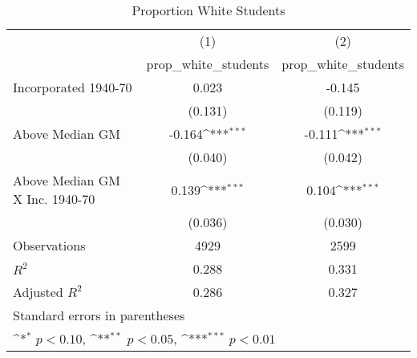 \begin{table}[htbp]\centering
\def\sym#1{\ifmmode^{#1}\else\(^{#1}\)\fi}
\caption{Proportion White Students}
\begin{tabular}{l*{2}{c}}
\hline\hline
                    &\multicolumn{1}{c}{(1)}&\multicolumn{1}{c}{(2)}\\
                    &\multicolumn{1}{c}{prop\_white\_students}&\multicolumn{1}{c}{prop\_white\_students}\\
\hline
Incorporated 1940-70&       0.023         &      -0.145         \\
                    &     (0.131)         &     (0.119)         \\
[1em]
Above Median GM     &      -0.164\sym{***}&      -0.111\sym{***}\\
                    &     (0.040)         &     (0.042)         \\
[1em]
Above Median GM X Inc. 1940-70&       0.139\sym{***}&       0.104\sym{***}\\
                    &     (0.036)         &     (0.030)         \\
\hline
Observations        &        4929         &        2599         \\
\(R^{2}\)           &       0.288         &       0.331         \\
Adjusted \(R^{2}\)  &       0.286         &       0.327         \\
\hline\hline
\multicolumn{3}{l}{\footnotesize Standard errors in parentheses}\\
\multicolumn{3}{l}{\footnotesize \sym{*} \(p<0.10\), \sym{**} \(p<0.05\), \sym{***} \(p<0.01\)}\\
\end{tabular}
\end{table}
